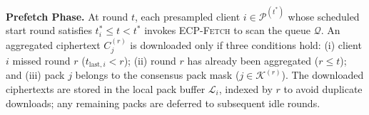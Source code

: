 \begingroup
{}
\setlength{\fboxrule}{0.4pt}
\setlength{\algomargin}{14pt}  
\begin{algorithm}[!t]
\small
\caption{\textsc{ECP} Downstream Module}
\label{alg:download}
\end{algorithm}
\endgroup

\textbf{Prefetch Phase.}
At round $t$, each presampled client $i \in \mathcal{P}^{(t^*)}$ whose scheduled start round satisfies $t_i^* \le t < t^*$ invokes \textsc{ECP-Fetch} to scan the queue $\mathcal{Q}$.
An aggregated ciphertext $C_j^{(r)}$ is downloaded only if three conditions hold:
(i) client $i$ missed round $r$ ($t_{\mathrm{last},i} < r$);
(ii) round $r$ has already been aggregated ($r \le t$);
and (iii) pack $j$ belongs to the consensus pack mask ($j \in \mathcal{K}^{(r)}$).
The downloaded ciphertexts are stored in the local pack buffer $\mathcal{L}_i$, indexed by $r$ to avoid duplicate downloads; any remaining packs are deferred to subsequent idle rounds.

